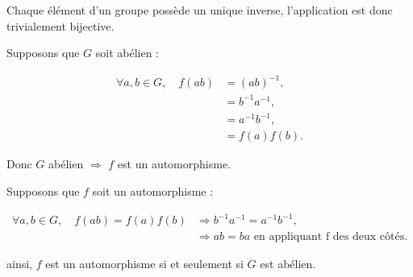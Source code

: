 Chaque élément d'un groupe possède un unique inverse, l'application est donc trivialement bijective.

Supposons que $G$ soit abélien :

\begin{align*}
    \forall a,b \in G,\quad f(ab) &= (ab)^{-1}, \\
    &= b^{-1} a^{-1}, \\
    &= a^{-1} b^{-1}, \\
    &= f(a)f(b).
\end{align*}

Donc $G$ abélien $\Rightarrow$ $f$ est un automorphisme.

Supposons que $f$ soit un automorphisme :

\begin{align*}
    \forall a,b \in G,\quad f(ab)=f(a)f(b) &\Rightarrow  b^{-1}a^{-1} = a^{-1}b^{-1}, \\
    &\Rightarrow ab = ba \text{ en appliquant f des deux côtés}.
\end{align*}

ainsi, $f$ est un automorphisme si et seulement si $G$ est abélien.